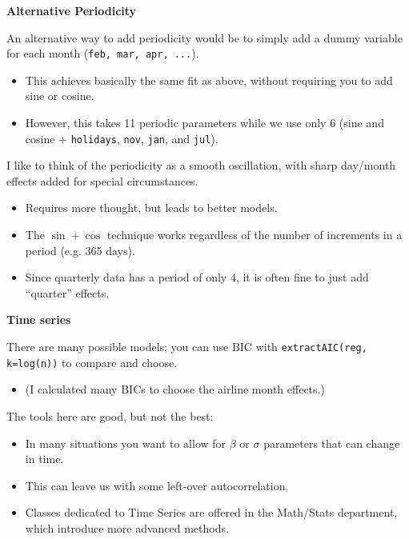 \documentclass[12pt,xcolor=svgnames]{beamer}
\newcommand{\rd}{\color{red}}
\newcommand{\bl}{\color{blue}}
\newcommand{\theme}{\color{FireBrick}}
\newcommand{\sk}{\vspace{.4cm}}
\newcommand{\nochap}{\vspace{0.5cm}}
\newcommand{\chap}[1]{{\theme \Large \bf #1} \sk}
\newcommand{\R}[1]{{\bl\tt #1}}
\begin{document}
\begin{frame}
\chap{Alternative Periodicity}

\sk
An alternative way to add periodicity would be to simply add
a dummy variable for each month ({\tt \bl feb, mar, apr, ...}).

\sk
\begin{itemize}
\item This achieves basically the same fit as above, without requiring you to
add sine or cosine.
\item However, this takes 11 periodic parameters while we use
only 6 ({\rd sine} and {\rd cosine} + {\tt\bl holidays}, {\tt\bl nov}, 
{\tt\bl jan}, and {\tt\bl jul}).  
\end{itemize}
\end{frame}

\begin{frame}
\nochap


I like to think of the periodicity as a smooth oscillation, 
with sharp day/month effects
added for special circumstances.

\sk
\begin{itemize}
\item Requires more thought, but leads to better models.
\item The $\sin+\cos$ technique works regardless of the 
number of increments in a period (e.g. 365 days).
\end{itemize}

\sk\sk {\rd The exception:} 
\begin{itemize}
\item Since quarterly data has a period of only 4,
it is often fine to just add ``quarter'' effects.
\end{itemize}
\end{frame}



\begin{frame}
\chap{Time series}

There are many possible models; you can use BIC with 
  \R{extractAIC(reg, k=log(n))} to compare and
choose.
\begin{itemize}
\item (I calculated many BICs to choose the airline month effects.)
\end{itemize}

\sk
The tools here are good, but not the best:
\begin{itemize}
\item In many situations you want to allow for $\beta$ or $\sigma$
parameters that can change in time.
\item This can leave us with some left-over autocorrelation.
\item Classes dedicated to Time Series are offered in the Math/Stats department, which introduce more advanced methods. 
\end{itemize}



\end{frame}

\fi
\end{document}
